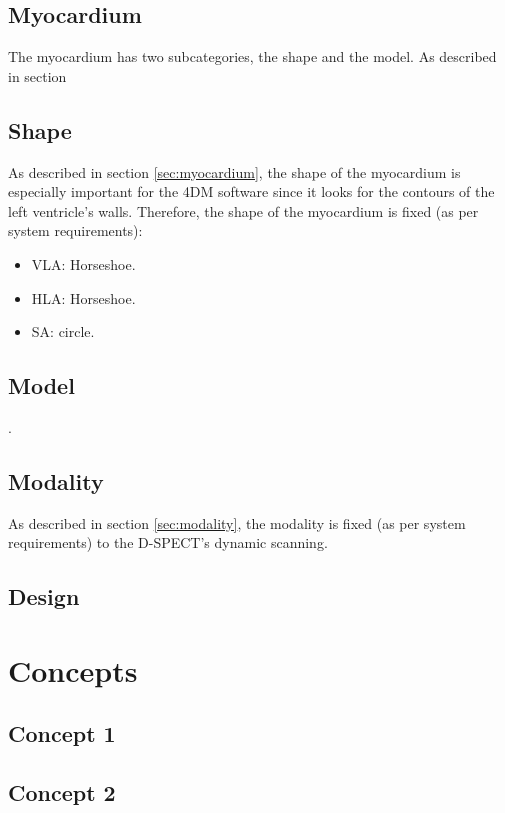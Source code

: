 \subsection{Myocardium}
The myocardium has two subcategories, the shape and the model. As described in section 
\subsection*{Shape}
As described in section \ref{sec:myocardium}, the shape of the myocardium is especially important for the 4DM software since it looks for the contours of the left ventricle's walls. Therefore, the shape of the myocardium is fixed (as per system requirements):
\begin{itemize}[noitemsep]
	\item \ac{VLA}: Horseshoe.
	\item \ac{HLA}: Horseshoe.
	\item \ac{SA}: circle.
\end{itemize}
\subsection*{Model}
.
\subsection{Modality}
As described in section \ref{sec:modality}, the modality is fixed (as per system requirements) to the D-SPECT's dynamic scanning.
\subsection{Design}


\section{Concepts}
\subsection{Concept 1}
\subsection{Concept 2}
